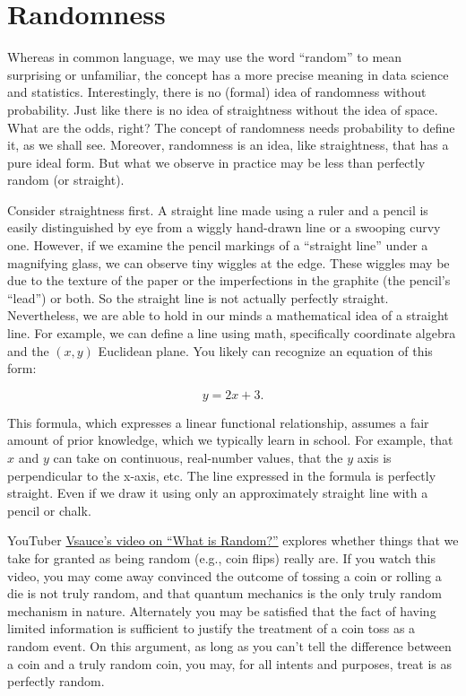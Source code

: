\documentclass[openany]{book}
\begin{document}
\hypertarget{appendix-appendix}{%
\appendix}


\hypertarget{sec:randomness}{%
\chapter{Randomness}\label{sec:randomness}}

Whereas in common language, we may use the word ``random'' to mean surprising or unfamiliar, the concept has a more precise meaning in data science and statistics. Interestingly, there is no (formal) idea of randomness without probability. Just like there is no idea of straightness without the idea of space. What are the odds, right? The concept of randomness needs probability to define it, as we shall see. Moreover, randomness is an idea, like straightness, that has a pure ideal form. But what we observe in practice may be less than perfectly random (or straight).

Consider straightness first. A straight line made using a ruler and a pencil is easily distinguished by eye from a wiggly hand-drawn line or a swooping curvy one. However, if we examine the pencil markings of a ``straight line'' under a magnifying glass, we can observe tiny wiggles at the edge. These wiggles may be due to the texture of the paper or the imperfections in the graphite (the pencil's ``lead'') or both. So the straight line is not actually perfectly straight. Nevertheless, we are able to hold in our minds a mathematical idea of a straight line. For example, we can define a line using math, specifically coordinate algebra and the \((x,y)\) Euclidean plane. You likely can recognize an equation of this form:

\[ y = 2 x + 3.\]

This formula, which expresses a linear functional relationship, assumes a fair amount of prior knowledge, which we typically learn in school. For example, that \(x\) and \(y\) can take on continuous, real-number values, that the \(y\) axis is perpendicular to the x-axis, etc. The line expressed in the formula is perfectly straight. Even if we draw it using only an approximately straight line with a pencil or chalk.

YouTuber \href{https://www.youtube.com/watch?v=9rIy0xY99a0}{Vsauce's video on ``What is Random?''} explores whether things that we take for granted as being random (e.g., coin flips) really are. If you watch this video, you may come away convinced the outcome of tossing a coin or rolling a die is not truly random, and that quantum mechanics is the only truly random mechanism in nature. Alternately you may be satisfied that the fact of having limited information is sufficient to justify the treatment of a coin toss as a random event. On this argument, as long as you can't tell the difference between a coin and a truly random coin, you may, for all intents and purposes, treat is as perfectly random.
\end{document}

